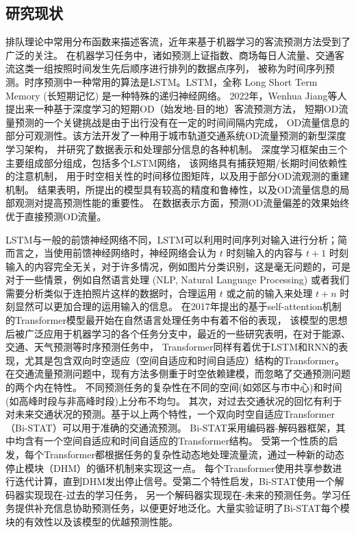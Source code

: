 \subsection{研究现状}
排队理论中常用分布函数来描述客流，近年来基于机器学习的客流预测方法受到了广泛的关注。
在机器学习任务中，诸如预测上证指数、商场每日人流量、交通客流这类一组按照时间发生先后顺序进行排列的数据点序列，
被称为时间序列预测。时序预测中一种常用的算法是LSTM。LSTM，全称 Long Short Term Memory (长短期记忆) 是一种特殊的递归神经网络。
2022年，Wenhua Jiang等人提出来一种基于深度学习的短期OD（始发地-目的地）客流预测方法\cite{DLOD2022}，
短期OD流量预测的一个关键挑战是由于出行没有在一定的时间间隔内完成，
OD流量信息的部分可观测性。该方法开发了一种用于城市轨道交通系统OD流量预测的新型深度学习架构，
并研究了数据表示和处理部分信息的各种机制。
深度学习框架由三个主要组成部分组成，包括多个LSTM网络，
该网络具有捕获短期/长期时间依赖性的注意机制，
用于时空相关性的时间移位图矩阵，以及用于部分OD流观测的重建机制。
结果表明，所提出的模型具有较高的精度和鲁棒性，以及OD流量信息的局部观测对提高预测性能的重要性。
在数据表示方面，预测OD流量偏差的效果始终优于直接预测OD流量。


LSTM与一般的前馈神经网络不同，LSTM可以利用时间序列对输入进行分析；简而言之，当使用前馈神经网络时，神经网络会认为 
$t$ 时刻输入的内容与 $t+1$ 时刻输入的内容完全无关，对于许多情况，例如图片分类识别，这是毫无问题的，可是对于一些情景，例如自然语言处理 (NLP, Natural Language Processing) 
或者我们需要分析类似于连拍照片这样的数据时，合理运用 $t$ 或之前的输入来处理 $t+n$
时刻显然可以更加合理的运用输入的信息。
在2017年提出的基于self-attention机制的Transformer模型\cite{vaswani2017attention}最开始在自然语言处理任务中有着不俗的表现，
该模型的思想后被广泛应用于机器学习的各个任务分支中，最近的一些研究表明，在对于能源、交通、天气预测等时序预测任务中，
Transformer同样有着优于LSTM和RNN的表现，尤其是包含双向时空适应（空间自适应和时间自适应）结构的Transformer\cite{transformer2022,9810964}。
在交通流量预测问题中，现有方法多侧重于时空依赖建模，而忽略了交通预测问题的两个内在特性。
不同预测任务的复杂性在不同的空间(如郊区与市中心)和时间(如高峰时段与非高峰时段)上分布不均匀。
其次，对过去交通状况的回忆有利于对未来交通状况的预测。基于以上两个特性，一个双向时空自适应Transformer（Bi-STAT）可以用于准确的交通流预测。
Bi-STAT采用编码器-解码器框架，其中均含有一个空间自适应和时间自适应的Transformer结构。
受第一个性质的启发，每个Transformer都根据任务的复杂性动态地处理流量流，通过一种新的动态停止模块（DHM）的循环机制来实现这一点。
每个Transformer使用共享参数进行迭代计算，直到DHM发出停止信号。受第二个特性启发，Bi-STAT使用一个解码器实现现在-过去的学习任务，
另一个解码器实现现在-未来的预测任务。学习任务提供补充信息协助预测任务，以便更好地泛化。大量实验证明了Bi-STAT每个模块的有效性以及该模型的优越预测性能。



